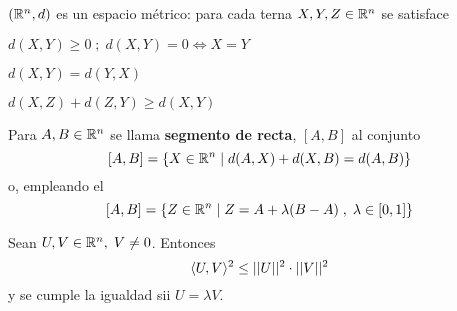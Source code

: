  $(\mathbb{R}^n,d)$ es un espacio métrico: para cada terna $X,Y,Z\in\mathbb{R}^n$ se satisface
\begin{itemizex}
	\item $d(X,Y) \ge 0\;;\; d(X,Y) = 0 \iff X=Y$
	\item $d(X,Y) = d(Y,X)$
	\item $d(X,Z) + d(Z,Y) \ge d(X,Y)$
\end{itemizex}
 Para $A,B \in \mathbb{R}^n$ se llama \textbf{segmento de recta}, $[A,B]$ al conjunto
$$[A,B] = \{X \in \mathbb{R}^n \;|\; d(A,X) + d(X,B) = d(A,B) \}$$
o, empleando el 
$$[A,B] = \{Z \in \mathbb{R}^n\;|\; Z = A + \lambda(B-A)\;,\; \lambda\in [0,1]\}$$

 Sean $U,V \in \mathbb{R}^n,\; V\neq 0$. Entonces
$$\langle U,V \rangle^2 \le ||U||^2\cdot||V||^2$$
y se cumple la igualdad sii $U = \lambda V$.

